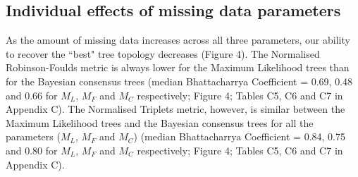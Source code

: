 \documentclass[12pt,letterpaper]{article}
\begin{document}


\subsection{Individual effects of missing data parameters}
As the amount of missing data increases across all three parameters, our ability to recover the ``best" tree topology decreases (Figure 4).
The Normalised Robinson-Foulds metric is always lower for the Maximum Likelihood trees than for the Bayesian consensus trees (median Bhattacharrya Coefficient = 0.69, 0.48 and 0.66 for $M_{L}$, $M_{F}$ and $M_{C}$ respectively; Figure 4; Tables C5, C6 and C7 in Appendix C). 
The Normalised Triplets metric, however, is similar between the Maximum Likelihood trees and the Bayesian consensus trees for all the parameters ($M_{L}$, $M_{F}$ and $M_{C}$) (median Bhattacharrya Coefficient = 0.84, 0.75 and 0.80 for $M_{L}$, $M_{F}$ and $M_{C}$ respectively; Figure 4; Tables C5, C6 and C7 in Appendix C).
\end{document}
